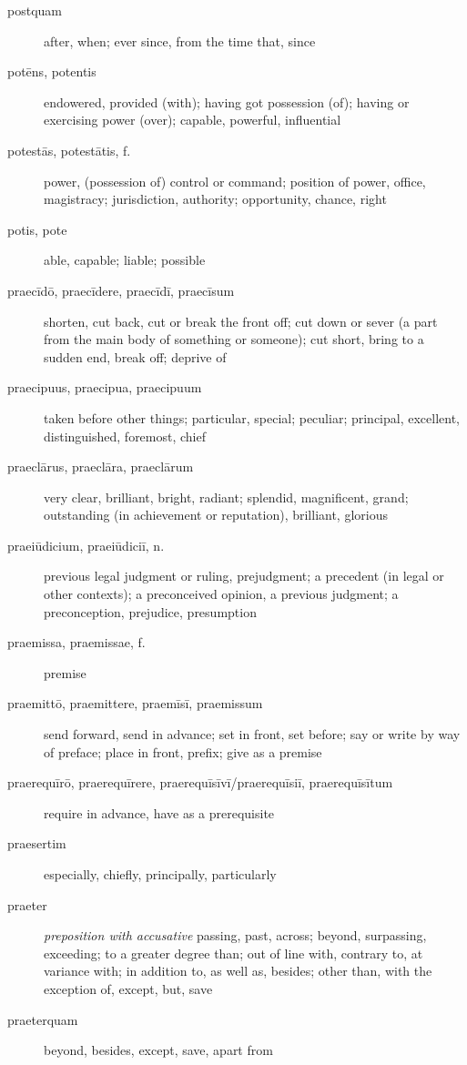 \begin{description}
    \item[postquam] \marginnote{*}after, when; ever since, from the time that, since
    \item[potēns, potentis] \marginnote{*}endowered, provided (with); having got possession (of); having or exercising power (over); capable, powerful, influential
    \item[potestās, potestātis, f.] \marginnote{*}power, (possession of) control or command; position of power, office, magistracy; jurisdiction, authority; opportunity, chance, right
    \item[potis, pote] \marginnote{*}able, capable; liable; possible
    \item[praecīdō, praecīdere, praecīdī, praecīsum] shorten, cut back, cut or break the front off; cut down or sever (a part from the main body of something or someone); cut short, bring to a sudden end, break off; deprive of
    \item[praecipuus, praecipua, praecipuum] taken before other things; particular, special; peculiar; principal, excellent, distinguished, foremost, chief
    \item[praeclārus, praeclāra, praeclārum] very clear, brilliant, bright, radiant; splendid, magnificent, grand; outstanding (in achievement or reputation), brilliant, glorious
    \item[praeiūdicium, praeiūdiciī, n.] previous legal judgment or ruling, prejudgment; a precedent (in legal or other contexts); a preconceived opinion, a previous judgment; a preconception, prejudice, presumption
    \item[praemissa, praemissae, f.] premise
    \item[praemittō, praemittere, praemīsī, praemissum] send forward, send in advance; set in front, set before; say or write by way of preface; place in front, prefix; give as a premise
    \item[praerequīrō, praerequīrere, praerequīsīvī/praerequīsiī, praerequīsītum] require in advance, have as a prerequisite
    \item[praesertim] especially, chiefly, principally, particularly
    \item[praeter] \marginnote{*}\textit{preposition with accusative} passing, past, across; beyond, surpassing, exceeding; to a greater degree than; out of line with, contrary to, at variance with; in addition to, as well as, besides; other than, with the exception of, except, but, save
    \item[praeterquam] beyond, besides, except, save, apart from

\end{description}
